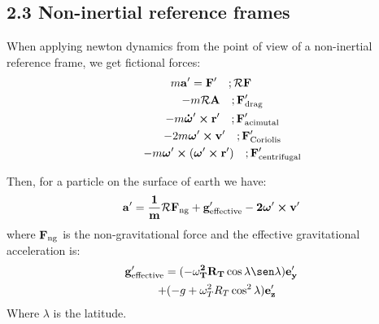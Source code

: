 \documentclass[a4paper,landscape,10pt]{cheatsheet}
\begin{document}
\subsection*{2.3 Non-inertial reference frames}
When applying newton dynamics from the point of view of a non-inertial reference frame, we get fictional forces:
\begin{gather*}
  m\bf{a}' = \bf{F}' \quad ;\mathcal{R}\bf{F}\\
  \qquad -m\mathcal{R}\bf{A} \quad ;\bf{F}'_\text{drag}\\
  \qquad -m\boldsymbol{\dot{\omega}}'\cross \bf{r}' \quad ;\bf{F}'_\text{acimutal}\\
  \qquad - 2m\boldsymbol{\omega}'\cross\bf{v}' \quad ;\bf{F}'_{\text{Coriolis}}\\
  \qquad -m\boldsymbol{\omega}'\cross(\boldsymbol{\omega}'\cross\bf{r}')  \quad ;\bf{F}'_{\text{centrifugal}}
\end{gather*}

Then, for a particle on the surface of earth we have:
\begin{gather*}
  \bf{a}' = \frac{1}{m}\mathcal{R}\bf{F}_\text{ng} + \textbf{g}'_\text{effective} - 2\boldsymbol{\omega}'\cross \textbf{v}' \\
\end{gather*}
where $\bf{F}_\text{ng}$ is the non-gravitational force and the effective gravitational acceleration is:
\begin{gather*}
  \bf{g}'_\text{effective} = (-\omega^2_T R_T \cos\lambda\sen\lambda)\textbf{e}'_y \\
  \quad + (-g + \omega^2_T R_T \cos^2\lambda)\bf{e}'_z
\end{gather*}
Where $\lambda$ is the latitude.
\end{document}
